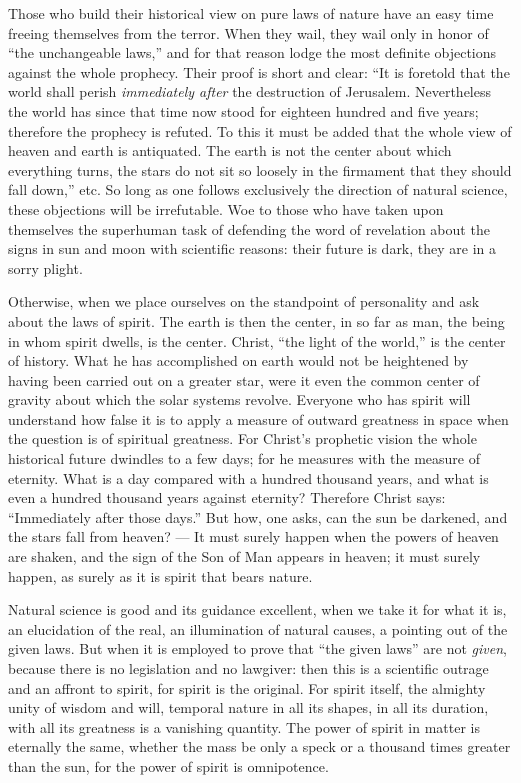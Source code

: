 \documentclass[12pt,a4paper,openany]{book}
\newcommand{\opage}[1]{\marginnote{\footnotesize\textit{[#1]}}}
\begin{document}
Those who build their historical view on pure laws of nature
have an easy time freeing themselves from
the terror. When they wail, they wail only in honor
of ``the unchangeable laws,'' and for that reason lodge
the most definite objections against the whole prophecy.
Their proof is short and clear: ``It is foretold that
the world shall perish \emph{immediately after} the destruction of Jerusalem.
Nevertheless the world has since that time
now stood for eighteen hundred and five years;
therefore the prophecy is refuted. To this it must be added
that the whole view of heaven and earth is antiquated.
The earth is not the center about which everything
turns, the stars do not sit so loosely in the firmament
that they should fall down,'' etc.
So long as one follows exclusively the direction of natural science,
these objections will be irrefutable.
Woe to those who have taken upon themselves the superhuman
task of defending the word of revelation about the signs in
sun and moon with scientific reasons: their future
is dark, they are in a sorry plight.

Otherwise, when we place ourselves on the standpoint
of personality and ask about the laws of spirit. The earth is then
the center, in so far as man, the being in whom
spirit dwells, is the center. Christ, ``the light of the world,''
is the center of history. What he has accomplished on
earth would not be heightened by having been carried out
on a greater star, were it even the common center of
\setcounter{footnote}{0}%
\opage{39}gravity about which the solar systems revolve. Everyone who
has spirit will understand how false it is to apply
a measure of outward greatness in space when
the question is of spiritual greatness. For Christ's prophetic
vision the whole historical future dwindles to a few
days; for he measures with the measure of eternity. What
is a day compared with a hundred thousand years, and what is
even a hundred thousand years against eternity? Therefore
Christ says: ``Immediately after those days.'' But how,
one asks, can the sun be darkened, and the stars fall
from heaven? --- It must surely happen when the powers of heaven
are shaken, and the sign of the Son of Man appears
in heaven; it must surely happen, as surely as it is spirit
that bears nature.

Natural science is good and its guidance excellent,
when we take it for what it is, an elucidation of the
real, an illumination of natural causes, a
pointing out of the given laws. But when it is employed
to prove that ``the given laws'' are not \emph{given}, because
there is no legislation and no lawgiver: then
this is a scientific outrage and an affront to
spirit, for spirit is the original. For spirit
itself, the almighty unity of wisdom and will, temporal
nature in all its shapes, in all its duration, with all its greatness
is a vanishing quantity.
The power of spirit in matter is eternally the same, whether
the mass be only a speck or a thousand times greater than
the sun, for the power of spirit is omnipotence.
\end{document}
